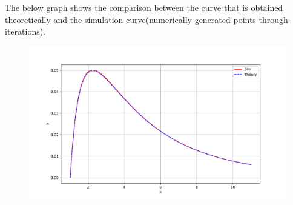 \documentclass[journal]{IEEEtran}
\begin{document}
\begin{enumerate}
The below graph shows the comparison between the curve that is obtained theoretically and the simulation curve(numerically generated points through iterations).
\end{enumerate}
\begin{figure}[htbp]
  \centering
  \includegraphics[width=\columnwidth]{figs/curve.pdf}
\end{figure}
\end{document}
